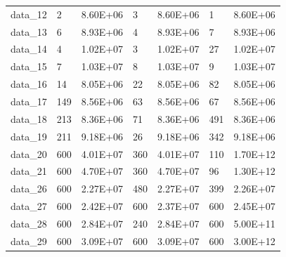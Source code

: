 \begin{table}[!h]
\begin{tabular}{lllllll}
data\_12 & 2                     & 8.60E+06                 & 3                   & 8.60E+06               & 1                    & 8.60E+06                \\
data\_13 & 6                     & 8.93E+06                 & 4                   & 8.93E+06               & 7                    & 8.93E+06                \\
data\_14 & 4                     & 1.02E+07                 & 3                   & 1.02E+07               & 27                   & 1.02E+07                \\
data\_15 & 7                     & 1.03E+07                 & 8                   & 1.03E+07               & 9                    & 1.03E+07                \\
data\_16 & 14                    & 8.05E+06                 & 22                  & 8.05E+06               & 82                   & 8.05E+06                \\
data\_17 & 149                   & 8.56E+06                 & 63                  & 8.56E+06               & 67                   & 8.56E+06                \\
data\_18 & 213                   & 8.36E+06                 & 71                  & 8.36E+06               & 491                  & 8.36E+06                \\
data\_19 & 211                   & 9.18E+06                 & 26                  & 9.18E+06               & 342                  & 9.18E+06                \\
data\_20 & 600                   & 4.01E+07                 & 360                 & 4.01E+07               & 110                  & 1.70E+12                \\
data\_21 & 600                   & 4.70E+07                 & 360                 & 4.70E+07               & 96                   & 1.30E+12                \\
data\_26 & 600                   & 2.27E+07                 & 480                 & 2.27E+07               & 399                  & 2.26E+07                \\
data\_27 & 600                   & 2.42E+07                 & 600                 & 2.37E+07               & 600                  & 2.45E+07                \\
data\_28 & 600                   & 2.84E+07                 & 240                 & 2.84E+07               & 600                  & 5.00E+11                \\
data\_29 & 600                   & 3.09E+07                 & 600                 & 3.09E+07               & 600                  & 3.00E+12                \\ \hline
\end{tabular}
\end{table}